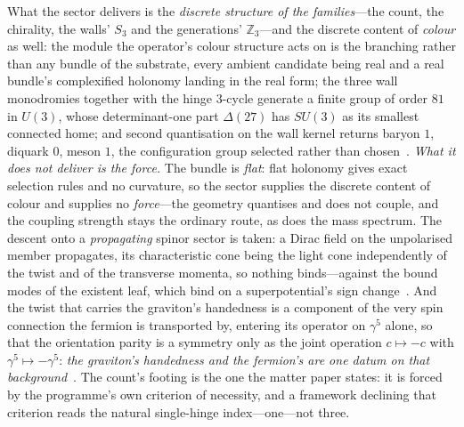 \documentclass[11pt,a4paper]{article}
\theoremstyle{plain}
\theoremstyle{definition}
\theoremstyle{remark}
\begin{document}
\begin{enumerate}
What the sector delivers is the \emph{discrete structure of the families}---the count, the chirality, the walls' $S_3$ and the generations' $\mathbb{Z}_3$---and the discrete content of \emph{colour} as well: the module the operator's colour structure acts on is the branching rather than any bundle of the substrate, every ambient candidate being real and a real bundle's complexified holonomy landing in the real form; the three wall monodromies together with the hinge $3$-cycle generate a finite group of order $81$ in $U(3)$, whose determinant-one part $\Delta(27)$ has $SU(3)$ as its smallest connected home; and second quantisation on the wall kernel returns baryon $1$, diquark $0$, meson $1$, the configuration group selected rather than chosen~\cite{JanzenMatter}. \emph{What it does not deliver is the force.} The bundle is \emph{flat}: flat holonomy gives exact selection rules and no curvature, so the sector supplies the discrete content of colour and supplies no \emph{force}---the geometry quantises and does not couple, and the coupling strength stays the ordinary route, as does the mass spectrum. The descent onto a \emph{propagating} spinor sector is taken: a Dirac field on the unpolarised member propagates, its characteristic cone being the light cone independently of the twist and of the transverse momenta, so nothing binds---against the bound modes of the existent leaf, which bind on a superpotential's sign change~\cite{JanzenMatter}. And the twist that carries the graviton's handedness is a component of the very spin connection the fermion is transported by, entering its operator on $\gamma^5$ alone, so that the orientation parity is a symmetry only as the joint operation $c\mapsto-c$ with $\gamma^5\mapsto-\gamma^5$: \emph{the graviton's handedness and the fermion's are one datum on that background}~\cite{JanzenDynamics}. The count's footing is the one the matter paper states: it is forced by the programme's own criterion of necessity, and a framework declining that criterion reads the natural single-hinge index---one---not three.


\end{enumerate}
\end{document}
